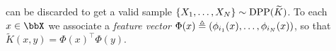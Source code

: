 \documentclass[twoside,11pt]{article}
\begin{document}
        can be discarded to get a valid sample $\left\{ X_{1}, \dots, X_{N} \right\} \sim \operatorname{DPP}(\widetilde{K})$.
        To each $x\in\bbX$ we associate a \emph{feature vector}
        $\Phi(x) \triangleq \left( \phi_{i_1}(x),\dots,\phi_{i_N}(x) \right)$,
        so that
        $\tilde{K}(x,y) = \Phi(x)^{\top} \Phi(y)$.

\end{document}
